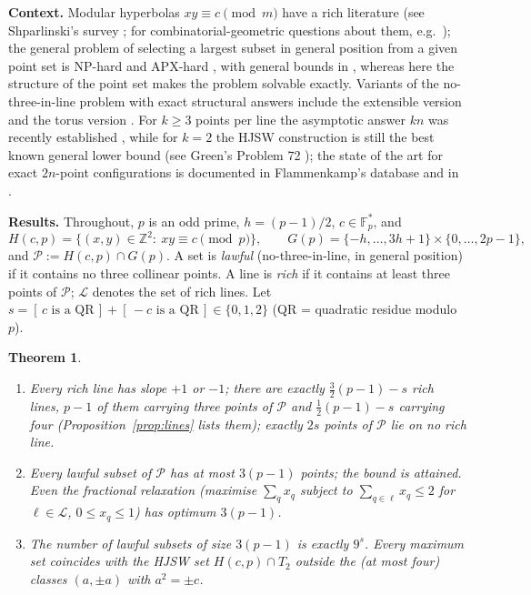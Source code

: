 \documentclass[11pt]{article}
\newtheorem{theorem}{Theorem}
\theoremstyle{remark}
\newcommand{\Fp}{\mathbb{F}_p}
\newcommand{\Z}{\mathbb{Z}}
\newcommand{\Hc}{H(c,p)}
\newcommand{\Gp}{G(p)}
\newcommand{\Lc}{\mathcal{L}}
\newcommand{\Pset}{\mathcal{P}}
\begin{document}
\medskip
\noindent\textbf{Context.}  Modular hyperbolas $xy\equiv c\pmod m$ have a rich literature (see Shparlinski's survey
\cite{Shp12}; for combinatorial-geometric questions about them, e.g.\ \cite{KMSW}); the general problem of selecting a
largest subset in general position from a given point set is NP-hard and APX-hard \cite{FKNN17}, with general bounds in
\cite{PW13}, whereas here the structure of the point set makes the problem solvable exactly.  Variants of the
no-three-in-line problem with exact structural answers include the extensible version \cite{NNW23,Ghosal26} and the torus
version \cite{KW18}.  For $k\ge3$ points per line the asymptotic answer $kn$ was recently established
\cite{GGGKKP26}, while for $k=2$ the HJSW construction is still the best known general lower bound (see Green's
Problem 72 \cite{Green}); the state of the art for exact $2n$-point configurations is documented in Flammenkamp's
database \cite{FlammenkampDB} and in \cite{Prellberg26}.

\medskip
\noindent\textbf{Results.}  Throughout, $p$ is an odd prime, $h=(p-1)/2$, $c\in\Fp^*$, and
\[
 \Hc=\{(x,y)\in\Z^2:\ xy\equiv c \pmod p\},\qquad
 \Gp=\{-h,\dots,3h+1\}\times\{0,\dots,2p-1\},
\]
and $\Pset:=\Hc\cap\Gp$.  A set is \emph{lawful} (no-three-in-line, in general position) if it contains no three collinear points.  A line is
\emph{rich} if it contains at least three points of $\Pset$; $\Lc$ denotes the set of rich lines.  Let
$s=[\,c\text{ is a QR}\,]+[\,-c\text{ is a QR}\,]\in\{0,1,2\}$ (QR = quadratic residue modulo $p$).

\begin{theorem}\label{thm:main}
\begin{enumerate}
\item[(i)] Every rich line has slope $+1$ or $-1$; there are exactly $\tfrac32(p-1)-s$ rich lines, $p-1$ of them
 carrying three points of $\Pset$ and $\tfrac12(p-1)-s$ carrying four (Proposition~\ref{prop:lines} lists them); exactly
 $2s$ points of $\Pset$ lie on no rich line.
\item[(ii)] Every lawful subset of $\Pset$ has at most $3(p-1)$ points; the bound is attained.  Even the fractional
 relaxation (maximise $\sum_q x_q$ subject to $\sum_{q\in\ell}x_q\le2$ for $\ell\in\Lc$, $0\le x_q\le1$) has optimum
 $3(p-1)$.
\item[(iii)] The number of lawful subsets of size $3(p-1)$ is exactly $9^{s}$.  Every maximum set coincides with the
 HJSW set $\Hc\cap T_2$ outside the (at most four) classes $(a,\pm a)$ with $a^2=\pm c$.
\end{enumerate}
\end{theorem}
\end{document}
